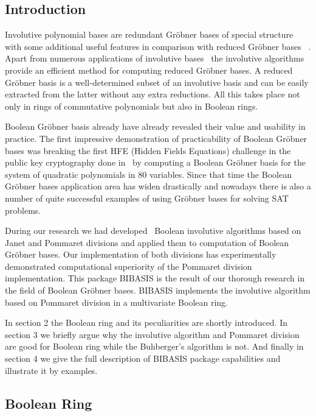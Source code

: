 

\subsection{Introduction}

Involutive polynomial bases are redundant Gr\"obner bases of special structure with some additional useful features in comparison 
with reduced Gr\"obner bases~\cite{GB'98} . Apart from numerous applications of involutive bases~\cite{Seiler'10} the 
involutive algorithms~\cite{Gerdt'05} provide an efficient method for computing reduced Gr\"obner bases. A reduced Gr\"obner basis 
is a well-determined subset of an involutive basis and can be easily extracted from the latter without any extra reductions. 
All this takes place not only in rings of commutative polynomials but also in Boolean rings.

Boolean Gr\"obner basis already have already revealed their value and usability in  practice. The first impressive demonstration
of practicability of Boolean Gr\"obner bases was breaking the first HFE (Hidden Fields Equations) challenge in the public
key cryptography done in~\cite{Faugere'03} by computing a Boolean Gr\"obner basis for the system of quadratic
polynomials in 80 variables. Since that time the Boolean Gr\"obner bases application area has widen drastically and nowadays there 
is also a number of quite successful examples of using Gr\"obner bases for solving SAT problems.

During our research we had developed~\cite{ISSAC'08, PaCS'08, PCA'09} Boolean involutive algorithms based on Janet and Pommaret 
divisions and applied them to computation of Boolean Gr\"obner bases. Our implementation of both divisions has experimentally 
demonstrated computational superiority of the Pommaret division implementation. This package BIBASIS is the result
of our thorough research in the field of Boolean Gr\"obner bases. BIBASIS implements the involutive algorithm based on Pommaret 
division in a multivariate Boolean ring.

In section 2 the Boolean ring and its peculiarities are shortly introduced. In section 3 we briefly argue  
why the involutive algorithm and Pommaret division are good for Boolean ring while the Buhberger's algorithm is not.
And finally in section 4 we give the full description of BIBASIS package capabilities and illustrate it by examples.

\subsection{Boolean Ring}

